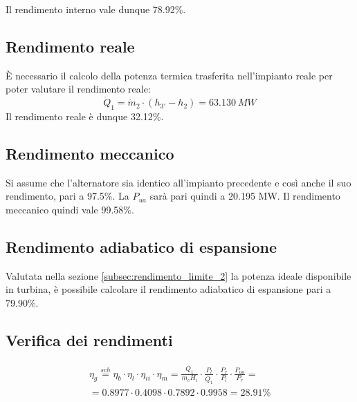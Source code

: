 Il rendimento interno vale dunque 78.92\%.

\subsection{Rendimento reale}
È necessario il calcolo della potenza termica trasferita nell'impianto reale per poter valutare il rendimento reale:
\begin{equation*}
    \dot Q_1 = \dot m_2 \cdot (h_{3'} - h_2) = 63.130\ MW
\end{equation*}
Il rendimento reale è dunque 32.12\%.

\subsection{Rendimento meccanico}
Si assume che l'alternatore sia identico all'impianto precedente e così anche il suo rendimento, pari a 97.5\%.
La $P_{ua}$ sarà pari quindi a 20.195 MW. Il rendimento meccanico quindi vale 99.58\%.

\subsection{Rendimento adiabatico di espansione}
Valutata nella sezione \ref{subsec:rendimento_limite_2} la potenza ideale disponibile in turbina, è possibile calcolare il rendimento adiabatico di espansione pari a
79.90\%.

\subsection{Verifica dei rendimenti}
\begin{align*}
    \eta_g \stackrel{sch}{=} \eta_b \cdot \eta_l \cdot \eta_{ii} \cdot \eta_m
    = \frac{\dot{Q_1}}{\dot{m}_c H_i}\cdot \frac{P_l}{\dot{Q_1}} \cdot \frac{P_r}{P_l}\cdot \frac{P_{ua}}{P_r} = \\
    =  0.8977 \cdot 0.4098 \cdot 0.7892 \cdot 0.9958 = 28.91 \%
\end{align*}
